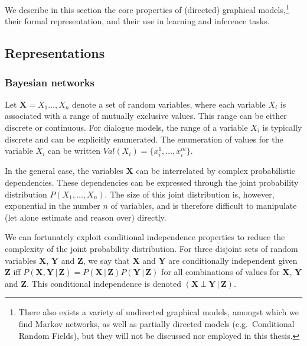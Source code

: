 We describe in this section the core properties of (directed) graphical models,\footnote{There also exists a variety of undirected graphical models, amongst which we find Markov networks, as well as partially directed models (e.g.\ Conditional Random Fields), but they will not be discussed nor employed in this thesis.} their formal representation, and their use in learning and inference tasks. 
 
 \subsection{Representations}
 \label{sec:gm-representation}
\subsubsection*{Bayesian networks}

Let $\mathbf{X} = X_1 \dots, X_n$ denote a set of random variables, where each variable $X_i$ is associated with a range of mutually exclusive values.  This range can be either discrete or continuous.  For dialogue models, the range of a variable $X_i$ is typically discrete and can be explicitly enumerated. The enumeration of values for the variable $X_i$ can be written $\mathit{Val}(X_i) = \{x_i^1, \dots, x_i^m\}$.  

In the general case, the variables $\mathbf{X}$ can be interrelated by complex probabilistic dependencies.  These dependencies can be expressed through the joint probability distribution $P(X_1, \dots, X_n)$.  The size of this joint distribution is, however,  exponential in the number $n$ of variables, and is therefore difficult to manipulate (let alone estimate and reason over) directly. 


We can fortunately exploit conditional independence properties to reduce the complexity of the joint probability distribution.  For three disjoint sets of random variables $\mathbf{X}$, $\mathbf{Y}$ and $\mathbf{Z}$, we say that $\mathbf{X}$ and $\mathbf{Y}$ are conditionally independent given $\mathbf{Z}$ iff $P(\mathbf{X},\mathbf{Y} \, | \, \mathbf{Z}) = P(\mathbf{X} \, | \, \mathbf{Z}) P(\mathbf{Y} \, | \, \mathbf{Z})$ for all combinations of values for  $\mathbf{X}$, $\mathbf{Y}$ and  $\mathbf{Z}$. This conditional independence is denoted $(\mathbf{X} \ \bot \  \mathbf{Y} \, | \,  \mathbf{Z})$. 

